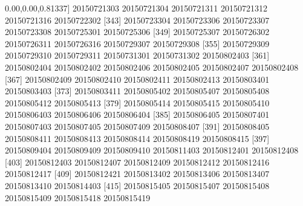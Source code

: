 \documentclass[
]{book}
\newenvironment{Shaded}{\begin{snugshade}}{\end{snugshade}}
\newcommand{\DecValTok}[1]{\textcolor[rgb]{0.00,0.00,0.81}{#1}}
\newcommand{\NormalTok}[1]{#1}
\begin{document}
\begin{Shaded}
\begin{Highlighting}[]
\NormalTok{[}\DecValTok{337}\NormalTok{] }\DecValTok{20150721303} \DecValTok{20150721304} \DecValTok{20150721311} \DecValTok{20150721312} \DecValTok{20150721316} \DecValTok{20150722302}
\NormalTok{[}\DecValTok{343}\NormalTok{] }\DecValTok{20150723304} \DecValTok{20150723306} \DecValTok{20150723307} \DecValTok{20150723308} \DecValTok{20150725301} \DecValTok{20150725306}
\NormalTok{[}\DecValTok{349}\NormalTok{] }\DecValTok{20150725307} \DecValTok{20150726302} \DecValTok{20150726311} \DecValTok{20150726316} \DecValTok{20150729307} \DecValTok{20150729308}
\NormalTok{[}\DecValTok{355}\NormalTok{] }\DecValTok{20150729309} \DecValTok{20150729310} \DecValTok{20150729311} \DecValTok{20150731301} \DecValTok{20150731302} \DecValTok{20150802403}
\NormalTok{[}\DecValTok{361}\NormalTok{] }\DecValTok{20150802404} \DecValTok{20150802402} \DecValTok{20150802406} \DecValTok{20150802405} \DecValTok{20150802407} \DecValTok{20150802408}
\NormalTok{[}\DecValTok{367}\NormalTok{] }\DecValTok{20150802409} \DecValTok{20150802410} \DecValTok{20150802411} \DecValTok{20150802413} \DecValTok{20150803401} \DecValTok{20150803403}
\NormalTok{[}\DecValTok{373}\NormalTok{] }\DecValTok{20150803411} \DecValTok{20150805402} \DecValTok{20150805407} \DecValTok{20150805408} \DecValTok{20150805412} \DecValTok{20150805413}
\NormalTok{[}\DecValTok{379}\NormalTok{] }\DecValTok{20150805414} \DecValTok{20150805415} \DecValTok{20150805410} \DecValTok{20150806403} \DecValTok{20150806406} \DecValTok{20150806404}
\NormalTok{[}\DecValTok{385}\NormalTok{] }\DecValTok{20150806405} \DecValTok{20150807401} \DecValTok{20150807403} \DecValTok{20150807405} \DecValTok{20150807409} \DecValTok{20150808407}
\NormalTok{[}\DecValTok{391}\NormalTok{] }\DecValTok{20150808405} \DecValTok{20150808411} \DecValTok{20150808413} \DecValTok{20150808414} \DecValTok{20150808419} \DecValTok{20150808415}
\NormalTok{[}\DecValTok{397}\NormalTok{] }\DecValTok{20150809404} \DecValTok{20150809409} \DecValTok{20150809410} \DecValTok{20150811403} \DecValTok{20150812401} \DecValTok{20150812408}
\NormalTok{[}\DecValTok{403}\NormalTok{] }\DecValTok{20150812403} \DecValTok{20150812407} \DecValTok{20150812409} \DecValTok{20150812412} \DecValTok{20150812416} \DecValTok{20150812417}
\NormalTok{[}\DecValTok{409}\NormalTok{] }\DecValTok{20150812421} \DecValTok{20150813402} \DecValTok{20150813406} \DecValTok{20150813407} \DecValTok{20150813410} \DecValTok{20150814403}
\NormalTok{[}\DecValTok{415}\NormalTok{] }\DecValTok{20150815405} \DecValTok{20150815407} \DecValTok{20150815408} \DecValTok{20150815409} \DecValTok{20150815418} \DecValTok{20150815419}

\end{Highlighting}
\end{Shaded}
\end{document}
